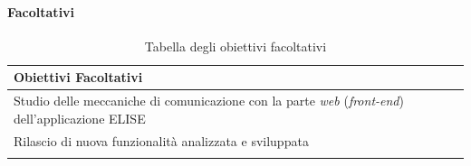 
	\paragraph{Facoltativi}

		\begin{center}
		  \bgroup
		  \def\arraystretch{1.4}
		   \setlength\arrayrulewidth{0.6pt}
		   \begin{longtable}{ | p{11cm} |} \hline
		   
		    \cellcolor[gray]{0.9} \textbf{Obiettivi Facoltativi} \\ \hline

			Studio delle meccaniche di comunicazione con la parte \textit{web} (\textit{front-end}) dell'applicazione ELISE \\ \hline
			Rilascio di nuova funzionalità analizzata e sviluppata \\ \hline

			
			\caption{Tabella degli obiettivi facoltativi}
			
		    \end{longtable}
		  \egroup
		\end{center}	

